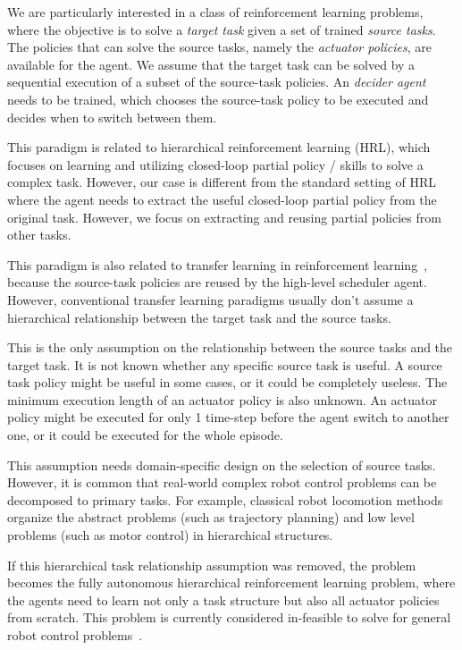 We are particularly interested in a class of reinforcement learning problems, where the objective is to solve a \textit{target task } given a set of trained \textit{source tasks}. The policies that can solve the source tasks, namely the \textit{actuator policies}, are available for the agent. We assume that the target task can be solved by a sequential execution of a subset of the source-task policies. An \textit{decider agent} needs to be trained, which chooses the source-task policy to be executed and decides when to switch between them.

This paradigm is related to hierarchical reinforcement learning (HRL), which focuses on learning and utilizing closed-loop partial policy / skills to solve a complex task. However, our case is different from the standard setting of HRL where the agent needs to extract the useful closed-loop partial policy from the original task. However, we focus on extracting and reusing partial policies from other tasks.

This paradigm is also related to transfer learning in reinforcement learning~\cite{taylor2009transfer}, because the source-task policies are reused by the high-level scheduler agent. However, conventional transfer learning paradigms usually don't assume a hierarchical relationship between the target task and the source tasks.

This is the only assumption on the relationship between the source tasks and the target task. It is not known whether any specific source task is useful. A source task policy might be useful in some cases, or it could be completely useless. The minimum execution length of an actuator policy is also unknown. An actuator policy might be executed for only 1 time-step before the agent switch to another one, or it could be executed for the whole episode.

This assumption needs domain-specific design on the selection of source tasks. However, it is common that real-world complex robot control problems can be decomposed to primary tasks. For example, classical robot locomotion methods organize the abstract problems (such as trajectory planning) and low level problems (such as motor control) in hierarchical structures.

If this hierarchical task relationship assumption was removed, the problem becomes the fully autonomous hierarchical reinforcement learning problem, where the agents need to learn not only a task structure but also all actuator policies from scratch. This problem is currently considered in-feasible to solve for general robot control problems~\cite{barto2003recent}.


